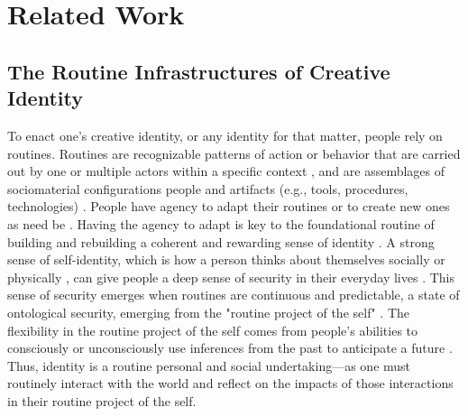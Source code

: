 \section{Related Work}
\subsection{The Routine Infrastructures of Creative Identity}

    To enact one's creative identity, or any identity for that matter, people rely on routines. Routines are recognizable patterns of action or behavior that are carried out by one or multiple actors within a specific context \cite{feldman2000organizational}, and are assemblages of sociomaterial configurations people and artifacts (e.g., tools, procedures, technologies) \cite{pentland2012dynamics, shelby2024creative, latour2007reassembling}. People have agency to adapt their routines or to create new ones as need be \cite{pentland2012dynamics}. Having the agency to adapt is key to the foundational routine of building and rebuilding a coherent and rewarding sense of identity \cite{giddens1991modernity}. A strong sense of self-identity, which is how a person thinks about themselves socially or physically \cite{gecas1982self}, can give people a deep sense of security in their everyday lives \cite{ibarra2010identity}. This sense of security emerges when routines are continuous and predictable, a state of ontological security, emerging from the "routine project of the self" \cite{giddens1991modernity}. The flexibility in the routine project of the self comes from people's abilities to consciously or unconsciously use inferences from the past to anticipate a future \cite{giddens1991modernity}. Thus, identity is a routine personal and social undertaking—as one must routinely interact with the world and reflect on the impacts of those interactions in their routine project of the self. 
    
